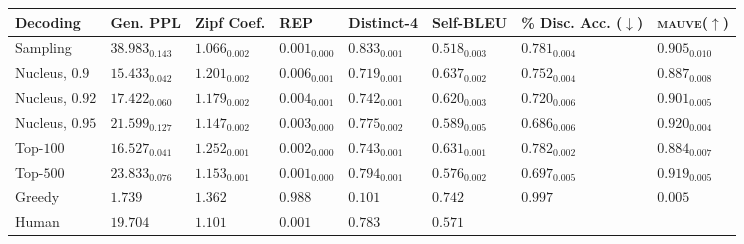 \documentclass{article}
\theoremstyle{definition}
\newcommand{\tabemph}[1]{\cellcolor{lightmauve!30}\textcolor{black!50!royalazure}{#1}}%
\begin{document}
\begin{table}[t!]
\centering
\begin{adjustbox}{max width=0.95\textwidth}
\begin{tabular}{llllllll}
\toprule
\textbf{Decoding} &                   \textbf{Gen. PPL} &                \textbf{Zipf Coef.} &                       \textbf{REP} &                \textbf{Distinct-4} &                 \textbf{Self-BLEU} & \textbf{\% Disc. Acc. ($\downarrow$)} & \textbf{\textsc{mauve}($\uparrow$)} \\
\midrule
Sampling          &           $38.983_{0.143}$ &  \tabemph{$\mathbf{1.066}_{0.002}$} &  \tabemph{$\mathbf{0.001}_{0.000}$} &           $0.833_{0.001}$ &           $0.518_{0.003}$ &              $0.781_{0.004}$ &            $0.905_{0.010}$ \\
Nucleus, $0.9$  &           $15.433_{0.042}$ &           $1.201_{0.002}$ &           $0.006_{0.001}$ &           $0.719_{0.001}$ &           $0.637_{0.002}$ &              $0.752_{0.004}$ &            $0.887_{0.008}$ \\
Nucleus, $0.92$ &           $17.422_{0.060}$ &           $1.179_{0.002}$ &           $0.004_{0.001}$ &           $0.742_{0.001}$ &           $0.620_{0.003}$ &              $0.720_{0.006}$ &            $0.901_{0.005}$ \\
Nucleus, $0.95$ &  \tabemph{$\mathbf{21.599}_{0.127}$} &           $1.147_{0.002}$ &           $0.003_{0.000}$ &  \tabemph{$\mathbf{0.775}_{0.002}$} &           $0.589_{0.005}$ &     \tabemph{$\mathbf{0.686}_{0.006}$} &   \tabemph{$\mathbf{0.920}_{0.004}$} \\
Top-$100$  &           $16.527_{0.041}$ &           $1.252_{0.001}$ &           $0.002_{0.000}$ &           $0.743_{0.001}$ &           $0.631_{0.001}$ &              $0.782_{0.002}$ &            $0.884_{0.007}$ \\
Top-$500$  &           $23.833_{0.076}$ &           $1.153_{0.001}$ &           $0.001_{0.000}$ &           $0.794_{0.001}$ &  \tabemph{$\mathbf{0.576}_{0.002}$} &              $0.697_{0.005}$ &            $0.919_{0.005}$ \\
Greedy            &                    $1.739$ &                   $1.362$ &                   $0.988$ &                   $0.101$ &                   $0.742$ &                      $0.997$ &                    $0.005$ \\
\midrule
Human             &                   $19.704$ &                   $1.101$ &                   $0.001$ &                   $0.783$ &                   $0.571$ &                              &                            \\

\end{tabular}
\end{adjustbox}
\end{table}
\end{document}
